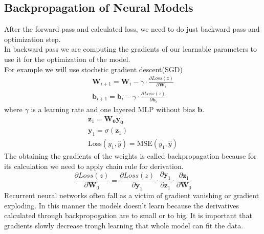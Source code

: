 \subsection{Backpropagation of Neural Models}
After the forward pass and calculated loss, we need to do just backward pass and optimization step.\\In backward pass we are computing the gradients of our learnable parameters to use it for the optimization of the model.\\
For example we will use stochstic gradient descent(SGD)
\begin{eqnarray}
	\mathbf{W}_{i+1} = \mathbf{W}_i - \gamma\cdot \frac{\partial Loss(z)}{\partial \mathbf{W}_i }\\
	\mathbf{b}_{i+1} = \mathbf{b}_i - \gamma\cdot \frac{\partial Loss(z)}{\partial \mathbf{b}_i }
\end{eqnarray} where $\gamma$ is a learning rate and one layered MLP
without bias $\mathbf{b}$.
\begin{eqnarray}
	\mathbf{z}_1 = \mathbf{W_0}\mathbf{y_0}\\ 
	\mathbf{y}_1 = \sigma(\mathbf{z}_1)\\
	\text{Loss}(y_1,\hat{y}) = \text{MSE}(y_1,\hat{y})
\end{eqnarray}
The obtaining the gradients of the weights is called backpropagation because for its calculation we need to apply chain rule for derivation.
\begin{equation}
\frac{\partial Loss(z)}{\partial \mathbf{W}_0}= \frac{\partial Loss(z)}{\partial \mathbf{y}_1} \cdot\frac{\partial \mathbf{y}_1}{\partial \mathbf{z}_1}\cdot	\frac{\partial \mathbf{z}_1}{\partial \mathbf{W}_0}
\end{equation}
Recurrent neural networks often fall as a victim of gradient vanishing or gradient exploding. In this manner the models doesn’t learn because the derivatives calculated through backpropogation are to small or to big. It is important that gradients slowly decrease trough learning that whole model can fit the data.
